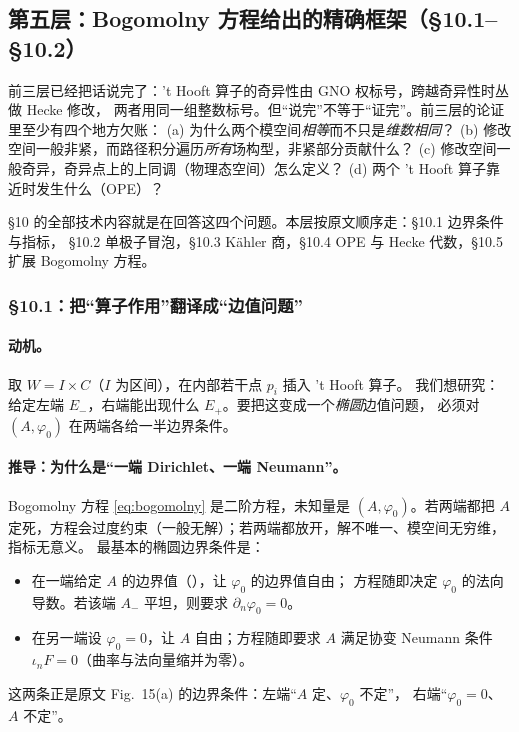 \subsection{第五层：Bogomolny 方程给出的精确框架（§10.1--§10.2）}
\label{sec:flesh-hecke-s10}

前三层已经把话说完了：'t Hooft{} 算子的奇异性由 GNO 权标号，跨越奇异性时丛做 Hecke 修改，
两者用同一组整数标号。但“说完”不等于“证完”。前三层的论证里至少有四个地方欠账：
(a) 为什么两个模空间\emph{相等}而不只是\emph{维数相同}？
(b) 修改空间一般非紧，而路径积分遍历\emph{所有}场构型，非紧部分贡献什么？
(c) 修改空间一般奇异，奇异点上的上同调（物理态空间）怎么定义？
(d) 两个 't Hooft{} 算子靠近时发生什么（OPE）？\pC

§10 的全部技术内容就是在回答这四个问题。本层按原文顺序走：§10.1 边界条件与指标，
§10.2 单极子冒泡，§10.3 Kähler 商，§10.4 OPE 与 Hecke 代数，§10.5 扩展 Bogomolny 方程。

\subsubsection{§10.1：把“算子作用”翻译成“边值问题”}

\paragraph{动机。}取 $W=I\times C$（$I$ 为区间），在内部若干点 $p_i$ 插入 't Hooft{} 算子。
我们想研究：给定左端 $E_-$，右端能出现什么 $E_+$。要把这变成一个\emph{椭圆}边值问题，
必须对 $(A,\varphi_0)$ 在两端各给一半边界条件。

\paragraph{推导：为什么是“一端 Dirichlet、一端 Neumann”。}
Bogomolny 方程 \eqref{eq:bogomolny} 是二阶方程，未知量是 $(A,\varphi_0)$。若两端都把 $A$
定死，方程会过度约束（一般无解）；若两端都放开，解不唯一、模空间无穷维，指标无意义。
最基本的椭圆边界条件是：
\begin{itemize}
\item 在一端给定 $A$ 的边界值（），让 $\varphi_0$ 的边界值自由；
  方程随即决定 $\varphi_0$ 的法向导数。若该端 $A_-$ 平坦，则要求 $\partial_n\varphi_0=0$。
\item 在另一端设 $\varphi_0=0$，让 $A$ 自由；方程随即要求 $A$ 满足协变 Neumann 条件
  $\iota_nF=0$（曲率与法向量缩并为零）。
\end{itemize}
这两条正是原文 Fig.~15(a) 的边界条件：左端“$A$ 定、$\varphi_0$ 不定”，
右端“$\varphi_0=0$、$A$ 不定”。\pA{}

